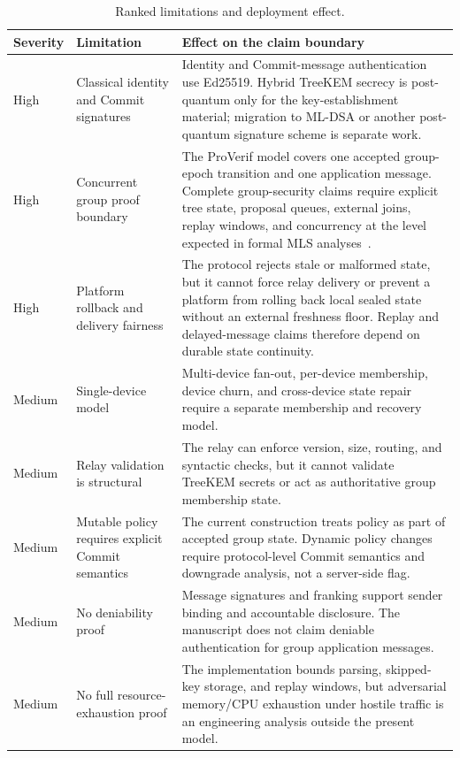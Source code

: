 \documentclass[preprint,12pt]{elsarticle}
\theoremstyle{definition}
\newcommand{\tech}[1]{\textnormal{#1}}
\newcommand{\ProVerif}{\tech{ProVerif}}
\begin{document}
\begin{table}[H]
\centering
\caption{Ranked limitations and deployment effect.}\label{tab:group-limitations}
\footnotesize
\setlength{\tabcolsep}{2pt}
\begin{tabularx}{\textwidth}{@{}L{0.13\textwidth}L{0.25\textwidth}Y@{}}
\toprule
Severity & Limitation & Effect on the claim boundary \\
\midrule
High & Classical identity and Commit signatures & Identity and Commit-message authentication use Ed25519. Hybrid TreeKEM secrecy is post-quantum only for the key-establishment material; migration to ML-DSA or another post-quantum signature scheme is separate work. \\
High & Concurrent group proof boundary & The \ProVerif{} model covers one accepted group-epoch transition and one application message. Complete group-security claims require explicit tree state, proposal queues, external joins, replay windows, and concurrency at the level expected in formal MLS analyses~\cite{treesync,meier2013}. \\
High & Platform rollback and delivery fairness & The protocol rejects stale or malformed state, but it cannot force relay delivery or prevent a platform from rolling back local sealed state without an external freshness floor. Replay and delayed-message claims therefore depend on durable state continuity. \\
Medium & Single-device model & Multi-device fan-out, per-device membership, device churn, and cross-device state repair require a separate membership and recovery model. \\
Medium & Relay validation is structural & The relay can enforce version, size, routing, and syntactic checks, but it cannot validate TreeKEM secrets or act as authoritative group membership state. \\
Medium & Mutable policy requires explicit Commit semantics & The current construction treats policy as part of accepted group state. Dynamic policy changes require protocol-level Commit semantics and downgrade analysis, not a server-side flag. \\
Medium & No deniability proof & Message signatures and franking support sender binding and accountable disclosure. The manuscript does not claim deniable authentication for group application messages. \\
Medium & No full resource-exhaustion proof & The implementation bounds parsing, skipped-key storage, and replay windows, but adversarial memory/CPU exhaustion under hostile traffic is an engineering analysis outside the present model. \\
\bottomrule
\end{tabularx}
\end{table}
\end{document}
